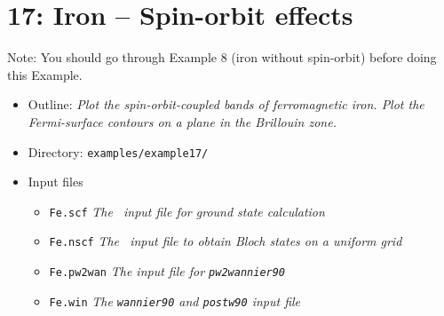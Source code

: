 \documentclass[a4paper,11pt,twoside]{article}
\begin{document}

\cleardoublepage


\section*{17: Iron -- Spin-orbit effects}

Note: You should go through Example 8 (iron without spin-orbit) before
doing this Example.

\begin{itemize}
\item{Outline: \it{Plot the spin-orbit-coupled bands of ferromagnetic
      iron.  Plot the Fermi-surface contours on a plane in the
      Brillouin zone.}}
\item{Directory: {\tt examples/example17/}}
\item{Input files}
\begin{itemize}
\item{ {\tt Fe.scf} {\it The \pwscf\ input file for ground state
    calculation}}
\item{ {\tt Fe.nscf}  {\it The \pwscf\ input file to obtain Bloch
    states on a uniform grid}} 
\item{ {\tt Fe.pw2wan}  {\it The input file for {\tt pw2wannier90}}}
\item{ {\tt Fe.win}  {\it The {\tt wannier90} and {\tt postw90} input file}}
\end{itemize}
\end{itemize}
\end{document}
